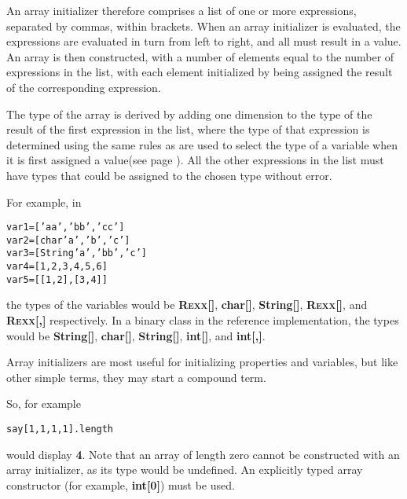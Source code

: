 An array initializer therefore comprises a list of one or more
expressions, separated by commas, within brackets.  When an array
initializer is evaluated, the expressions are evaluated in turn from
left to right, and all must result in a value.
An array is then constructed, with a number of elements
equal to the number of expressions in the list, with each element
initialized by being assigned the result of the corresponding
expression.
 
The type of the array is derived by adding one dimension to the type of
the result of the first expression in the list, where the type of that
expression is determined using the same rules as are used to select the
type of a variable when it is first  assigned a value(see page \pageref{refassign}).
All the other expressions in the list must have types that could be
assigned to the chosen type without error.
 
For example, in
\begin{alltt}
var1=['aa', 'bb', 'cc']
var2=[char 'a', 'b', 'c']
var3=[String 'a', 'bb', 'c']
var4=[1, 2, 3, 4, 5, 6]
var5=[[1,2], [3,4]]
\end{alltt}
the types of the variables would
be \textbf{R\textsc{exx}[]}, \textbf{char[]}, \textbf{String[]}, \textbf{R\textsc{exx}[]},
and \textbf{R\textsc{exx}[,]} respectively.
In a binary class in the reference implementation, the types would
be \textbf{String[]}, \textbf{char[]}, \textbf{String[]}, \textbf{int[]},
and \textbf{int[,]}.
 
Array initializers are most useful for initializing properties and
variables, but like other simple terms, they may start a compound term.
 
So, for example
\begin{alltt}
say [1,1,1,1].length
\end{alltt}
would display \textbf{4}.
 Note that an array of length zero cannot be constructed with an array
initializer, as its type would be undefined.  An explicitly typed array
constructor (for example, \textbf{int[0]}) must be used.
